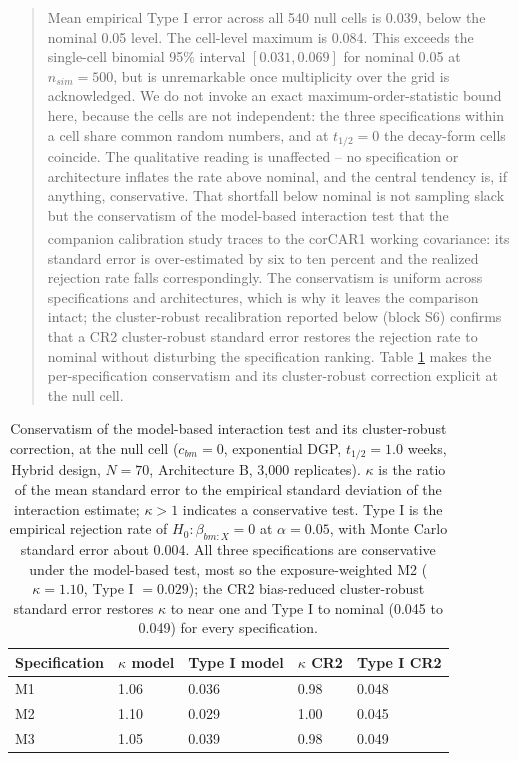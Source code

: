 \documentclass[
  11pt,
]{article}
\newenvironment{orig}{%
  \begin{quote}\normalsize\color[gray]{0.55}}{%
  \end{quote}}
\begin{document}
\begin{orig}
Mean empirical Type I error across all 540 null cells is 0.039,
below the nominal 0.05 level. The cell-level maximum is 0.084. This
exceeds the single-cell binomial 95\% interval \([0.031, 0.069]\) for
nominal 0.05 at \(n_{sim} = 500\), but is unremarkable once
multiplicity over the grid is acknowledged. We do not invoke an
exact maximum-order-statistic bound here, because the cells are not
independent: the three specifications within a cell share common
random numbers, and at \(t_{1/2} = 0\) the decay-form cells coincide.
The qualitative reading is unaffected -- no specification or
architecture inflates the rate above nominal, and the central
tendency is, if anything, conservative. That shortfall below
nominal is not sampling slack but the conservatism of the
model-based
interaction test that the companion calibration study\textsuperscript{} traces to the corCAR1 working
covariance: its standard error is over-estimated by six to ten
percent and the realized rejection rate falls correspondingly.
The conservatism is uniform across specifications and
architectures, which is why it leaves the comparison intact;
the cluster-robust recalibration reported below (block S6) confirms
that a CR2 cluster-robust standard error restores the rejection rate
to nominal without disturbing the specification ranking. Table \ref{tab:tab-type1-cr2} makes the
per-specification conservatism and its cluster-robust correction
explicit at the null cell.

\end{orig}

\begin{table}

\caption{\label{tab:tab-type1-cr2}Conservatism of the model-based interaction test and its
    cluster-robust correction, at the null cell ($c_{bm} = 0$,
    exponential DGP, $t_{1/2} = 1.0$ weeks, Hybrid design, $N = 70$,
    Architecture B, 3{,}000 replicates). $\kappa$ is the ratio of the
    mean standard error to the empirical standard deviation of the
    interaction estimate; $\kappa > 1$ indicates a conservative test.
    Type I is the empirical rejection rate of
    $H_0: \beta_{bm:X} = 0$ at $\alpha = 0.05$, with Monte Carlo
    standard error about 0.004. All three specifications are
    conservative under the model-based test, most so the
    exposure-weighted M2 ($\kappa = 1.10$, Type I $= 0.029$); the CR2
    bias-reduced cluster-robust standard error restores $\kappa$ to
    near one and Type I to nominal (0.045 to 0.049) for every
    specification.}
\centering
\begin{tabular}[t]{lllll}
\toprule
Specification & $\kappa$ model & Type I model & $\kappa$ CR2 & Type I CR2\\
\midrule
M1 & 1.06 & 0.036 & 0.98 & 0.048\\
M2 & 1.10 & 0.029 & 1.00 & 0.045\\
M3 & 1.05 & 0.039 & 0.98 & 0.049\\
\bottomrule
\end{tabular}
\end{table}
\end{document}
